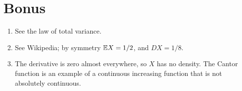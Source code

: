 \documentclass[a4paper]{article}
\begin{document}
\section*{Bonus}
\begin{enumerate}
\item See the law of total variance.
\item See Wikipedia; by symmetry $\mathbb {E} X=1/2$, and $DX=1/8$.
\item The derivative is zero almost everywhere, so $X$ has no density. The Cantor function is an example of a continuous increasing function that is not absolutely continuous.
\end{enumerate}
\end{document}
